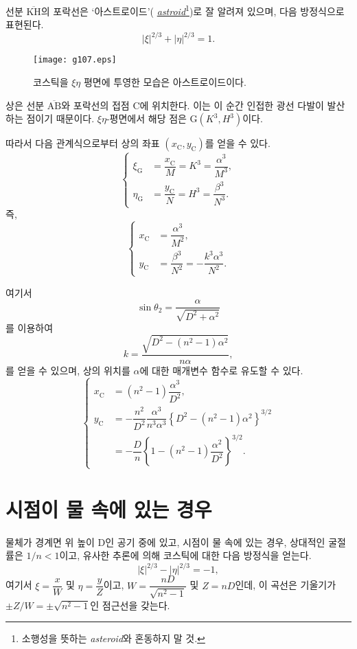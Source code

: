 \documentclass[twocolumn]{article}
\begin{document}
선분 $\overline{\mathrm{KH}}$의 포락선은 `아스트로이드'(%
\href{https://en.wikipedia.org/wiki/Astroid}{\emph{astroid}}\footnote{
소행성을 뜻하는 \emph{asteroid}와 혼동하지 말 것.})로 잘 알려져 있으며, 
다음 방정식으로 표현된다.
$$ \left| \xi \right|^{2/3} + \left| \eta \right|^{2/3} = 1. $$

\begin{figure}[h]
	\centering
	\texttt{[image: g107.eps]}	
	\caption{코스틱을 $\xi\eta$ 평면에 투영한 모습은 아스트로이드이다.}
	\label{fig:astroid}
\end{figure}

상은 선분 $\overline{\mathrm{AB}}$와 포락선의 접점 $\mathrm{C}$에 위치한다. 
이는 이 순간 인접한 광선 다발이 발산하는 점이기 때문이다. 
$\xi\eta$-평면에서 해당 점은 $\mathrm{G}(K^3, H^3)$이다.
	
따라서 다음 관계식으로부터 상의 좌표 $(x_{\mathrm{C}}^{}, y_{\mathrm{C}}^{})$를 얻을 수 있다.
$$ \left\{ 
\begin{aligned}
	\xi_{\mathrm{G}}^{} &= \dfrac{x_{\mathrm{C}}^{}}{M} = K^3 = \dfrac{\alpha^3}{M^3},\\
	\eta_{\mathrm{G}}^{} &= \dfrac{y_{\mathrm{C}}^{}}{N} = H^3 = \dfrac{\beta^3}{N^3}.
\end{aligned}
\right.$$
즉,
$$ \left\{ 
\begin{aligned}
	x_{\mathrm{C}}^{} &= \dfrac{\alpha^3}{M^2},\\
	y_{\mathrm{C}}^{} &= \dfrac{\beta^3}{N^2}=-\dfrac{k^3\alpha^3}{N^2}.
\end{aligned}
\right.$$

여기서
	$$\sin\theta_2 = \dfrac{\alpha}{\sqrt{D^2+\alpha^2}}$$
를 이용하여
$$k = \dfrac{\sqrt{D^2-(n^2-1)\alpha^2}}{n\alpha},$$
를 얻을 수 있으며, 
상의 위치를 $\alpha$에 대한 매개변수 함수로 유도할 수 있다.
$$ \left\{ 
\begin{aligned}
	x_{\mathrm{C}}^{} &= (n^2-1)\dfrac{\alpha^3}{D^2},\\
	y_{\mathrm{C}}^{} &= -\dfrac{n^2}{D^2}\dfrac{\alpha^3}
	{n^3\alpha^3}\left\{ D^2-(n^2-1)\alpha^2 \right\}^{3/2}\\
	&=-\dfrac{D}{n}\left\{ 1-(n^2-1)\dfrac{\alpha^2}{D^2} \right\}^{3/2}.
\end{aligned}
\right.$$
	
\section{시점이 물 속에 있는 경우}

물체가 경계면 위 높이 D인 공기 중에 있고, 
시점이 물 속에 있는 경우, 상대적인 굴절률은 $1/n < 1$이고, 
유사한 추론에 의해 코스틱에 대한 다음 방정식을 얻는다.
$$ \left| \xi \right|^{2/3} - \left| \eta \right|^{2/3} = -1, $$
여기서 $\xi = \dfrac{x}{W} $ 및 $\eta = \dfrac{y}{Z}$이고, 
$W = \dfrac{nD}{\sqrt{n^2-1}}$ 및 $Z = nD$인데,  이 곡선은 기울기가 
$\pm Z/W = \pm \sqrt{n^2-1}$인 점근선을 갖는다.
\end{document}
